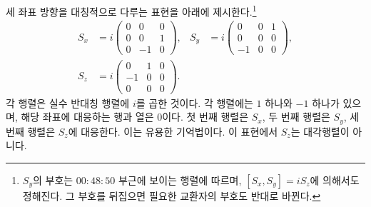 세 좌표 방향을 대칭적으로 다루는 표현을 아래에 제시한다.\footnote{\(S_y\)의 부호는 \(00{:}48{:}50\) 부근에 보이는 행렬에 따르며, \([S_x,S_y]=iS_z\)에 의해서도 정해진다. 그 부호를 뒤집으면 필요한 교환자의 부호도 반대로 바뀐다.}
\begin{equation}
\begin{aligned}
S_x
&=
i
\begin{pmatrix}
0&0&0\\
0&0&1\\
0&-1&0
\end{pmatrix},
&
S_y
&=
i
\begin{pmatrix}
0&0&1\\
0&0&0\\
-1&0&0
\end{pmatrix},\\
S_z
&=
i
\begin{pmatrix}
0&1&0\\
-1&0&0\\
0&0&0
\end{pmatrix}.
\end{aligned}
\end{equation}
각 행렬은 실수 반대칭 행렬에 \(i\)를 곱한 것이다. 각 행렬에는 \(1\) 하나와 \(-1\) 하나가 있으며, 해당 좌표에 대응하는 행과 열은 0이다. 첫 번째 행렬은 \(S_x\), 두 번째 행렬은 \(S_y\), 세 번째 행렬은 \(S_z\)에 대응한다. 이는 유용한 기억법이다. 이 표현에서 \(S_z\)는 대각행렬이 아니다.


